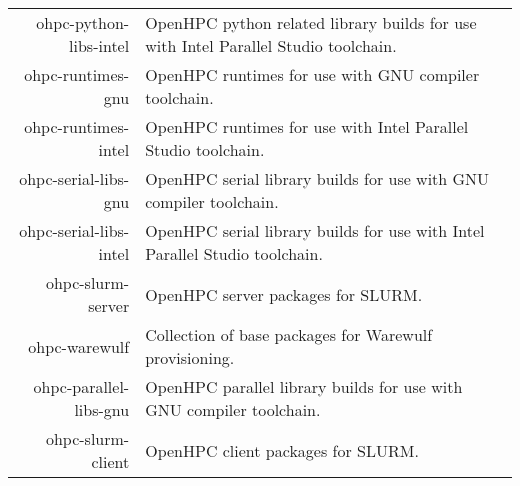 \begin{tabularx}{\textwidth}{r|X}
ohpc-python-libs-intel & OpenHPC python related library builds for use with Intel Parallel Studio toolchain. \\ 
ohpc-runtimes-gnu & OpenHPC runtimes for use with GNU compiler toolchain. \\ 
ohpc-runtimes-intel & OpenHPC runtimes for use with Intel Parallel Studio toolchain. \\ 
ohpc-serial-libs-gnu & OpenHPC serial library builds for use with GNU compiler toolchain. \\ 
ohpc-serial-libs-intel & OpenHPC serial library builds for use with Intel Parallel Studio toolchain. \\ 
ohpc-slurm-server & OpenHPC server packages for SLURM. \\ 
ohpc-warewulf & Collection of base packages for Warewulf provisioning. \\ 
ohpc-parallel-libs-gnu & OpenHPC parallel library builds for use with GNU compiler toolchain. \\ 
ohpc-slurm-client & OpenHPC client packages for SLURM. \\ 
\bottomrule
\end{tabularx}
